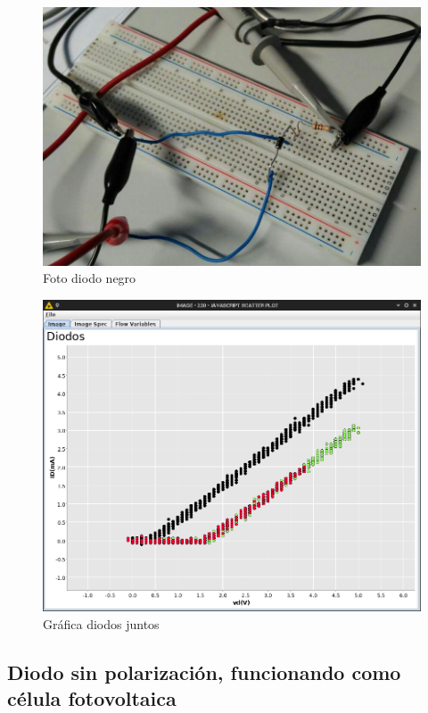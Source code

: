 \documentclass[paper=a4, fontsize=11pt]{scrartcl} %
\numberwithin{equation}{section} %
\numberwithin{figure}{section} %
\numberwithin{table}{section} %
\begin{document}
\begin{itemize}
	\begin{figure}[H]
		\centering
		\includegraphics[scale=0.5]{image/foto-diodo-negro}
		\caption{Foto diodo negro}
		\label{fig:foto-diodo-negro}
	\end{figure}
	
	\begin{figure}[H]
		\centering
		\includegraphics[scale=0.35]{image/all-diodos}
		\caption{Gráfica diodos juntos}
		\label{fig:grafica-diodo-todos}
	\end{figure}
	
\end{itemize}

\newpage

\subsection{Diodo sin polarización, funcionando como célula fotovoltaica}
\end{document}
